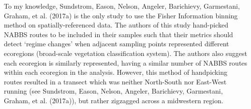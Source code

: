 \documentclass[12pt,twoside,openany]{reedthesis}
\begin{document}
To my knowledge, Sundstrom, Eason, Nelson, Angeler, Barichievy, Garmestani, Graham, et al. (2017a) is the only study to use the Fisher Information binning method on spatially-referenced data. The authors of this study hand-picked NABBS routes to be included in their samples such that their metrics should detect `regime changes' when adjacent sampling points represented different ecoregions (broad-scale vegetation classification system). The authors also suggest each ecoregion is similarly represented, having a similar number of NABBS routes within each ecoregion in the analysis. However, this method of handpicking routes resulted in a transect which was neither North-South nor East-West running (see Sundstrom, Eason, Nelson, Angeler, Barichievy, Garmestani, Graham, et al. (2017a)), but rather zigzagged across a midwestern region.
\end{document}
